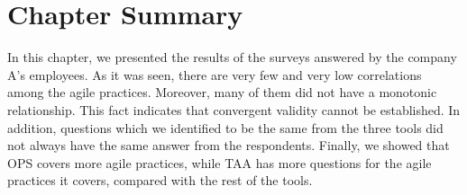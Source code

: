 

\section{Chapter Summary}
In this chapter, we presented the results of the surveys answered by the company A's employees. As it was seen, there are very few and very low correlations among the agile practices. Moreover, many of them did not have a monotonic relationship. This fact indicates that convergent validity cannot be established. In addition, questions which we identified to be the same from the three tools did not always have the same answer from the respondents. Finally, we showed that \ac{OPS} covers more agile practices, while \ac{TAA} has more questions for the agile practices it covers, compared with the rest of the tools.
